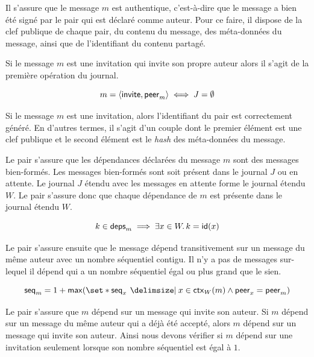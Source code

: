 
Il s'assure que le message $m$ est authentique, c'est-à-dire que le message a bien été signé par le pair qui est déclaré comme auteur.
Pour ce faire, il dispose de la clef publique de chaque pair, du contenu du message, des méta-données du message, ainsi que de l'identifiant du contenu partagé.

Si le message $m$ est une invitation qui invite son propre auteur alors il s'agit de la première opération du journal.

\begin{equation*}
    m = \tuple*{\trm{invite}, \trm{peer}_m} \iff J = \emptyset %
\end{equation*}

Si le message $m$ est une invitation, alors l'identifiant du pair est correctement généré.
En d'autres termes, il s'agit d'un couple dont le premier élément est une clef publique et le second élément est le \emph{hash} des méta-données du message.

Le pair s'assure que les dépendances déclarées du message $m$ sont des messages bien-formés.
Les messages bien-formés sont soit présent dans le journal $J$ ou en attente.
Le journal $J$ étendu avec les messages en attente forme le journal étendu $W$.
Le pair s'assure donc que chaque dépendance de $m$ est présente dans le journal étendu $W$.

\begin{equation*}
    k \in \operatorname{\mathsf{deps}}_m \implies \exists x \in W \ldotp k = \operatorname{\mathsf{id}}(x)
\end{equation*}

Le pair s'assure ensuite que le message dépend transitivement sur un message du même auteur avec un nombre séquentiel contigu.
Il n'y a pas de messages sur-lequel il dépend qui a un nombre séquentiel égal ou plus grand que le sien.

\begin{equation*}
    \trm{seq}_m = 1 + \trm{max}(\set*{\trm{seq}_x \given x \in \trm{ctx}_W(m) \land \trm{peer}_x = \trm{peer}_m})
\end{equation*}

Le pair s'assure que $m$ dépend sur un message qui invite son auteur.
Si $m$ dépend sur un message du même auteur qui a déjà été accepté, alors $m$ dépend sur un message qui invite son auteur.
Ainsi nous devons vérifier si $m$ dépend sur une invitation seulement lorsque son nombre séquentiel est égal à $1$.

